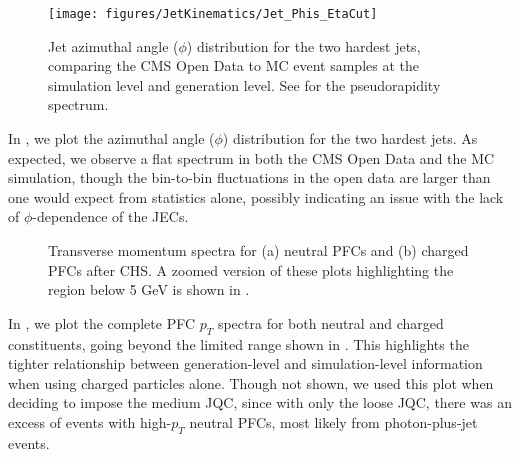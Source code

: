 \documentclass[aps,prd,twocolumn,preprintnumbers,nofootinbib,longbibliography,floatfix,superscriptaddress]{revtex4-1}
\begin{document}
\begin{figure*}
  \centering
	\texttt{[image: figures/JetKinematics/Jet\_Phis\_EtaCut]}
 \caption{
 Jet azimuthal angle ($\phi$) distribution for the two hardest jets, comparing the CMS Open Data to MC event samples at the simulation level and generation level.
 See  for the pseudorapidity spectrum.}
    \label{fig:phispectrum}
\end{figure*}


In , we plot the azimuthal angle ($\phi$) distribution for the two hardest jets.
%
As expected, we observe a flat spectrum in both the CMS Open Data and the MC simulation, though the bin-to-bin fluctuations in the open data are larger than one would expect from statistics alone, possibly indicating an issue with the lack of $\phi$-dependence of the JECs.


\begin{figure*}
  \caption{Transverse momentum spectra for (a) neutral PFCs and (b) charged PFCs after CHS.  A zoomed version of these plots highlighting the region below 5 GeV is shown in .}
  \label{fig:PFC_spectrum}
\end{figure*}


In , we plot the complete PFC $p_T$ spectra for both neutral and charged constituents, going beyond the limited range shown in .
%
This highlights the tighter relationship between generation-level and simulation-level information when using charged particles alone.
%
Though not shown, we used this plot when deciding to impose the medium JQC, since with only the loose JQC, there was an excess of events with high-$p_T$ neutral PFCs, most likely from photon-plus-jet events.
\end{document}

